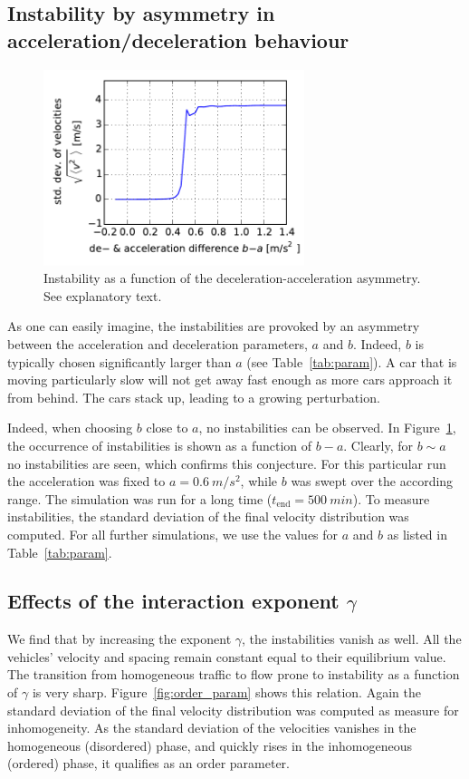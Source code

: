 \subsection{Instability by asymmetry in acceleration/deceleration behaviour}
\label{sec:asymm}

\begin{figure}
    \centering
    \includegraphics[width=3in]{../img/order_parameter_delta_acceleration.pdf}
    \caption{Instability as a function of the deceleration-acceleration asymmetry. See explanatory text.}
    \label{fig:order_parameter_delta_acceleration}
\end{figure}
As one can easily imagine, the instabilities are provoked by an asymmetry between the acceleration and deceleration parameters, $a$ and $b$. Indeed, $b$ is typically chosen significantly larger than $a$ (see Table~\ref{tab:param}). A car that is moving particularly slow will not get away fast enough as more cars approach it from behind. The cars stack up, leading to a growing perturbation.

Indeed, when choosing $b$ close to $a$, no instabilities can be observed. In Figure~\ref{fig:order_parameter_delta_acceleration}, the occurrence of instabilities is shown as a function of $b-a$. Clearly, for $b\sim a$ no instabilities are seen, which confirms this conjecture.
For this particular run the acceleration was fixed to $a=\SI{0.6}{m/s^2}$, while $b$ was swept over the according range. The simulation was run for a long time ($t_\mathrm{end} = \SI{500}{min}$). To measure instabilities, the standard deviation of the final velocity distribution was computed. For all further simulations, we use the values for $a$ and $b$ as listed in Table~\ref{tab:param}.

\subsection{Effects of the interaction exponent $\gamma$}
We find that by increasing the exponent $\gamma$, the instabilities vanish as well. All the vehicles' velocity and spacing remain constant equal to their equilibrium value. The transition from homogeneous traffic to flow prone to instability as a function of $\gamma$ is very sharp. Figure~\ref{fig:order_param} shows this relation. Again the standard deviation of the final velocity distribution was computed as measure for inhomogeneity. As the standard deviation of the velocities vanishes in the homogeneous (disordered) phase, and quickly rises in the inhomogeneous (ordered) phase, it qualifies as an order parameter.

